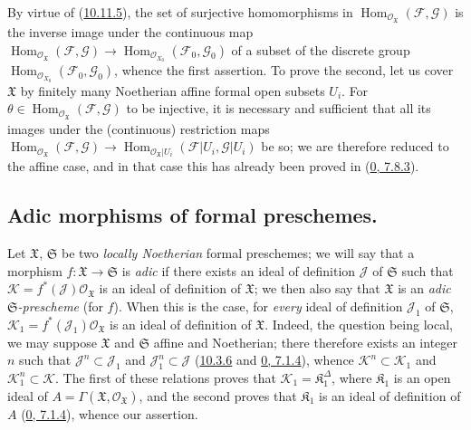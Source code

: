 By virtue of (\hyperref[I.10.11.5]{10.11.5}), the set of
surjective homomorphisms in
$\operatorname{Hom}_{\mathscr{O}_{\mathfrak{X}}}
(\mathscr{F},\mathscr{G})$ is the inverse image under the continuous
map
$\operatorname{Hom}_{\mathscr{O}_{\mathfrak{X}}}
(\mathscr{F},\mathscr{G})\to
\operatorname{Hom}_{\mathscr{O}_{X_0}}(\mathscr{F}_0,\mathscr{G}_0)$
of a subset of the discrete group
$\operatorname{Hom}_{\mathscr{O}_{X_0}}(\mathscr{F}_0,\mathscr{G}_0)$,
whence the first assertion. To prove the second, let us cover
$\mathfrak{X}$ by finitely many Noetherian affine formal open subsets
$U_i$. For
$\theta\in\operatorname{Hom}_{\mathscr{O}_{\mathfrak{X}}}
(\mathscr{F},\mathscr{G})$ to be injective, it is necessary and sufficient
that all its images under the (continuous) restriction maps
$\operatorname{Hom}_{\mathscr{O}_{\mathfrak{X}}}
(\mathscr{F},\mathscr{G})\to
\operatorname{Hom}_{\mathscr{O}_{\mathfrak{X}}|U_i}
(\mathscr{F}|U_i,\mathscr{G}|U_i)$ be so; we are therefore reduced to the
affine case, and in that case this has already been proved in
(\hyperref[0.7.8.3]{0, 7.8.3}).


\subsection{Adic morphisms of formal preschemes.}
\label{subsection:I.10.12}

\begin{env}[10.12.1]
\label{I.10.12.1}
Let $\mathfrak{X}$, $\mathfrak{S}$ be two \emph{locally Noetherian}
formal preschemes; we will say that a morphism
$f:\mathfrak{X}\to\mathfrak{S}$ is \emph{adic} if there exists an ideal
of definition $\mathscr{J}$ of $\mathfrak{S}$ such that
$\mathscr{K}=f^*(\mathscr{J})\mathscr{O}_{\mathfrak{X}}$ is an ideal of
definition of $\mathfrak{X}$; we then also say that $\mathfrak{X}$ is
an \emph{adic $\mathfrak{S}$-prescheme} (for $f$). When this is
the case, for \emph{every} ideal of definition $\mathscr{J}_1$ of
$\mathfrak{S}$,
$\mathscr{K}_1=f^*(\mathscr{J}_1)\mathscr{O}_{\mathfrak{X}}$ is an ideal
of definition of $\mathfrak{X}$. Indeed, the question being local, we
may suppose $\mathfrak{X}$ and $\mathfrak{S}$ affine and Noetherian; there
therefore exists an integer $n$ such that $\mathscr{J}^n\subset\mathscr{J}_1$ and
$\mathscr{J}_1^n\subset\mathscr{J}$
(\hyperref[I.10.3.6]{10.3.6} and
\hyperref[0.7.1.4]{0, 7.1.4}), whence
$\mathscr{K}^n\subset\mathscr{K}_1$ and
$\mathscr{K}_1^n\subset\mathscr{K}$. The first of these relations proves
that $\mathscr{K}_1=\mathfrak{K}_1^\Delta$, where $\mathfrak{K}_1$ is an
open ideal of
$A=\Gamma(\mathfrak{X},\mathscr{O}_{\mathfrak{X}})$, and the second proves
that $\mathfrak{K}_1$ is an ideal of definition of $A$
(\hyperref[0.7.1.4]{0, 7.1.4}), whence our assertion.
\end{env}

